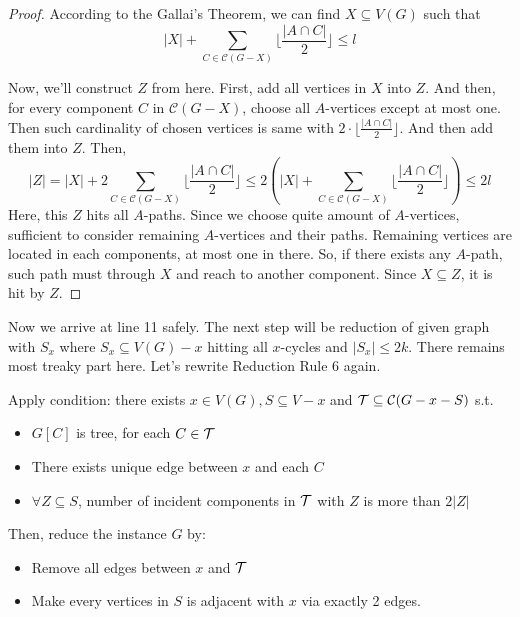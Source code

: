 \documentclass[12pt, a4paper, openany, twoside]{book}
\theoremstyle{definition}
\theoremstyle{remark}
\newcommand{\CC}{{\mathcal {C}}} \newcommand{\CD}{{\mathcal {D}}}
\theoremstyle{plain}
\numberwithin{equation}{section}
\begin{document}
\begin{proof}
    
According to the Gallai's Theorem, we can find $X \subseteq V(G)$ such that 
\[|X| + \sum_{C \in \CC(G-X)} \lfloor \frac{|A\cap C|}{2} \rfloor \leq l\]

Now, we'll construct $Z$ from here. First, add all vertices in $X$ into $Z$. And then, 
for every component $C$ in $\CC(G - X)$, choose all $A$-vertices except at most one. Then such cardinality of chosen vertices is same with 
$2 \cdot \lfloor \frac{|A\cap C|}{2}\rfloor$. And then add them into $Z$. Then, 
\[|Z| = |X| + 2 \sum_{C \in \CC(G - X)} \lfloor \frac{|A\cap C|}{2} \rfloor \leq 2\left(|X| + \sum_{C \in \CC(G - X)} \lfloor \frac{|A\cap C|}{2} \rfloor\right) \leq 2l\]
Here, this $Z$ hits all $A$-paths. Since we choose quite amount of $A$-vertices, sufficient to consider remaining $A$-vertices and their paths. 
Remaining vertices are located in each components, at most one in there. So, if there exists any $A$-path, 
such path must through $X$ and reach to another component. Since $X \subseteq Z$, it is hit by $Z$. 
\end{proof}

\newpage

Now we arrive at line 11 safely. 
The next step will be reduction of given graph with $S_x$ where $S_x \subseteq V(G) - x$ hitting all $x$-cycles and $|S_x| \leq 2k$. 
There remains most treaky part here. Let's rewrite Reduction Rule 6 again. 

\begin{tcolorbox}[colback=yellow!10!white,colframe=blue!75!black,title=Reduction Rule 6]

Apply condition: there exists $x \in V(G), S \subseteq V - x$ and $\CT \subseteq \CC(G - x - S)$ s.t.
\begin{itemize}
    \item $G[C]$ is tree, for each $C \in {\mathcal {T}}$
    \item There exists unique edge between $x$ and each $C$
    \item $\forall Z \subseteq S$, number of incident components in ${\mathcal {T}}$ with $Z$ is more than $2|Z|$ 
\end{itemize}

Then, reduce the instance $G$ by: 

\begin{itemize}
    \item Remove all edges between $x$ and ${\mathcal {T}}$
    \item Make every vertices in $S$ is adjacent with $x$ via exactly 2 edges.
\end{itemize}

\end{tcolorbox}
\end{document}

